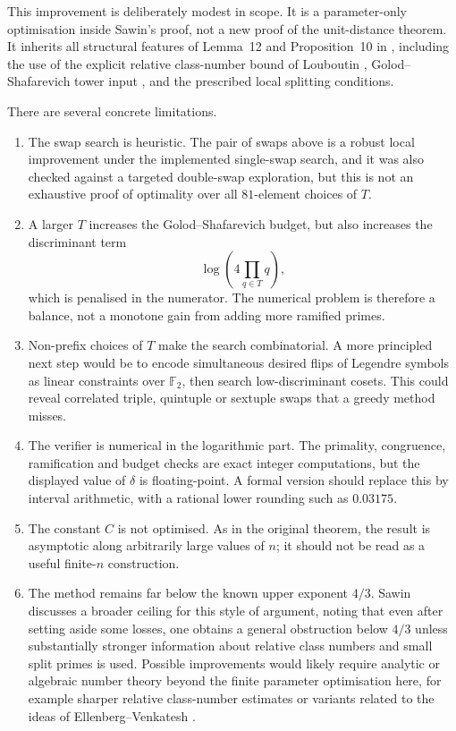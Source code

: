 \documentclass[11pt]{amsart}
\begin{document}
This improvement is deliberately modest in scope.  It is a parameter-only optimisation inside Sawin's proof, not a new proof of the unit-distance theorem.  It inherits all structural features of Lemma~12 and Proposition~10 in \cite{SawinExplicitLowerBound}, including the use of the explicit relative class-number bound of Louboutin \cite{Louboutin2000}, Golod--Shafarevich tower input \cite{GolodShafarevich1964,Koch1969,Vinberg1965,NeukirchSchmidtWingberg2008}, and the prescribed local splitting conditions.

There are several concrete limitations.

\begin{enumerate}[label=(\roman*)]
  \item The swap search is heuristic.  The pair of swaps above is a robust local improvement under the implemented single-swap search, and it was also checked against a targeted double-swap exploration, but this is not an exhaustive proof of optimality over all $81$-element choices of $T$.

  \item A larger $T$ increases the Golod--Shafarevich budget, but also increases the discriminant term
  \[
    \log\!\left(4\prod_{q\in T}q\right),
  \]
  which is penalised in the numerator.  The numerical problem is therefore a balance, not a monotone gain from adding more ramified primes.

  \item Non-prefix choices of $T$ make the search combinatorial.  A more principled next step would be to encode simultaneous desired flips of Legendre symbols as linear constraints over $\mathbb{F}_2$, then search low-discriminant cosets.  This could reveal correlated triple, quintuple or sextuple swaps that a greedy method misses.

  \item The verifier is numerical in the logarithmic part.  The primality, congruence, ramification and budget checks are exact integer computations, but the displayed value of $\delta$ is floating-point.  A formal version should replace this by interval arithmetic, with a rational lower rounding such as $0.03175$.

  \item The constant $C$ is not optimised.  As in the original theorem, the result is asymptotic along arbitrarily large values of $n$; it should not be read as a useful finite-$n$ construction.

  \item The method remains far below the known upper exponent $4/3$.  Sawin discusses a broader ceiling for this style of argument, noting that even after setting aside some losses, one obtains a general obstruction below $4/3$ unless substantially stronger information about relative class numbers and small split primes is used.  Possible improvements would likely require analytic or algebraic number theory beyond the finite parameter optimisation here, for example sharper relative class-number estimates or variants related to the ideas of Ellenberg--Venkatesh \cite{EllenbergVenkatesh2007}.
\end{enumerate}
\end{document}
